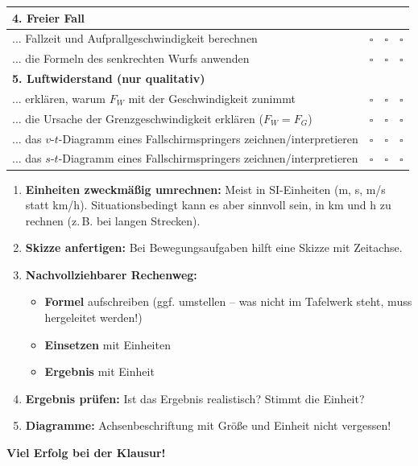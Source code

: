 \documentclass[11pt, a4paper]{article}
\begin{document}
\begin{center}
\begin{tabular}{|p{10cm}|c|c|c|}
\hline
\multicolumn{4}{|l|}{\textbf{4. Freier Fall}} \\
\hline
... Fallzeit und Aufprallgeschwindigkeit berechnen & $\square$ & $\square$ & $\square$ \\
\hline
... die Formeln des senkrechten Wurfs anwenden & $\square$ & $\square$ & $\square$ \\
\hline
\multicolumn{4}{|l|}{\textbf{5. Luftwiderstand (nur qualitativ)}} \\
\hline
... erklären, warum $F_W$ mit der Geschwindigkeit zunimmt & $\square$ & $\square$ & $\square$ \\
\hline
... die Ursache der Grenzgeschwindigkeit erklären ($F_W = F_G$) & $\square$ & $\square$ & $\square$ \\
\hline
... das $v$-$t$-Diagramm eines Fallschirmspringers zeichnen/interpretieren & $\square$ & $\square$ & $\square$ \\
\hline
... das $s$-$t$-Diagramm eines Fallschirmspringers zeichnen/interpretieren & $\square$ & $\square$ & $\square$ \\
\hline
\end{tabular}
\end{center}

\vspace{1em}

\begin{tcolorbox}[colback=hellblau, colframe=physik, boxrule=1pt, title=\textbf{Tipps für die Klausur}]
\begin{enumerate}
    \item \textbf{Einheiten zweckmäßig umrechnen:} Meist in SI-Einheiten (m, s, m/s statt km/h). Situationsbedingt kann es aber sinnvoll sein, in km und h zu rechnen (z.\,B. bei langen Strecken).

    \item \textbf{Skizze anfertigen:} Bei Bewegungsaufgaben hilft eine Skizze mit Zeitachse.

    \item \textbf{Nachvollziehbarer Rechenweg:}
    \begin{itemize}[leftmargin=1em]
        \item \textbf{Formel} aufschreiben (ggf. umstellen -- was nicht im Tafelwerk steht, muss hergeleitet werden!)
        \item \textbf{Einsetzen} mit Einheiten
        \item \textbf{Ergebnis} mit Einheit
    \end{itemize}

    \item \textbf{Ergebnis prüfen:} Ist das Ergebnis realistisch? Stimmt die Einheit?

    \item \textbf{Diagramme:} Achsenbeschriftung mit Größe und Einheit nicht vergessen!
\end{enumerate}
\end{tcolorbox}

\vspace{1em}

\begin{center}
\textbf{Viel Erfolg bei der Klausur!}
\end{center}
\end{document}
